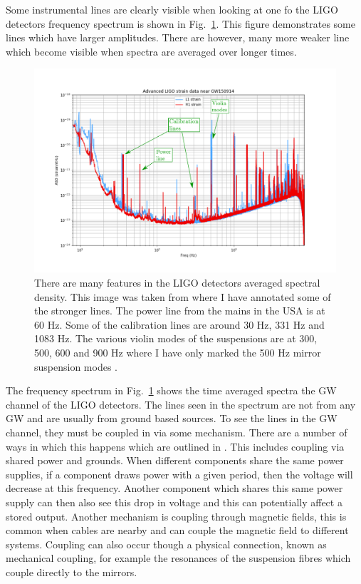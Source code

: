 Some instrumental lines are clearly visible when looking at one fo the \ac{LIGO} detectors frequency spectrum is shown in Fig.~\ref{detchar:line:psd}. This figure demonstrates some lines which have larger amplitudes. There are however, many more weaker line which become visible when spectra are averaged over longer times.
\begin{figure}
    \centering
    \includegraphics[width=\textwidth]{C5_detchar/ligo_o1_asd_annot.pdf}
    \caption{There are many features in the \ac{LIGO} detectors averaged spectral density. This image was taken from \citep{GWOpen} where I have annotated some of the stronger lines. The power line from the mains in the USA is at 60 Hz. Some of the calibration lines are around 30 Hz, 331 Hz and 1083 Hz. The various violin modes of the suspensions are at 300, 500, 600 and 900 Hz where I have only marked the 500 Hz mirror suspension modes \citep{GWOpen}.}
    \label{detchar:line:psd}
\end{figure}
The frequency spectrum in Fig.~\ref{detchar:line:psd} shows the time averaged spectra the \ac{GW} channel of the \ac{LIGO} detectors. 
The lines seen in the spectrum are not from any \ac{GW} and are usually from ground based sources.
To see the lines in the \ac{GW} channel, they must be coupled in via some mechanism. 
There are a number of ways in which this happens which are outlined in \citep{covas2018IdentificationMitigation}.
This includes coupling via shared power and grounds. 
When different components share the same power supplies, if a component draws power with a given period, then the voltage will decrease at this frequency. 
Another component which shares this same power supply can then also see this drop in voltage and this can potentially affect a stored output. 
Another mechanism is coupling through magnetic fields, this is common when cables are nearby and can couple the magnetic field to different systems.
Coupling can also occur though a physical connection, known as mechanical coupling, for example the resonances of the suspension fibres which couple directly to the mirrors.


